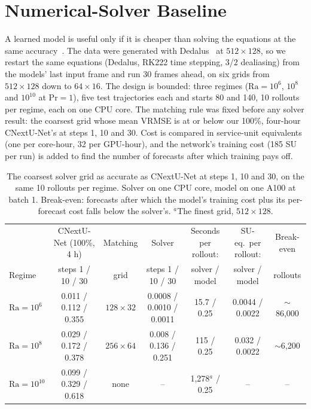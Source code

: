 \documentclass[11pt]{article}
\begin{document}
\section{Numerical-Solver Baseline}
\label{sec:solver}

A learned model is useful only if it is cheaper than solving the equations at the same accuracy~\cite{mcgreivy2024weak}.
The data were generated with Dedalus~\cite{burns2020dedalus} at $512\times128$, so we restart the same equations
(Dedalus, RK222 time stepping, 3/2 dealiasing) from the models' last input frame and run 30 frames ahead, on six
grids from $512\times128$ down to $64\times16$. The design is bounded: three regimes ($\mathrm{Ra}=10^6$, $10^8$ and
$10^{10}$ at $\mathrm{Pr}=1$), five test trajectories each and starts 80 and 140, 10 rollouts per regime, each on one
CPU core. The matching rule was fixed before any solver result: the coarsest grid whose mean VRMSE is at or below our
100\%, four-hour CNextU-Net's at steps 1, 10 and 30. Cost is compared in service-unit equivalents (one per core-hour,
32 per GPU-hour), and the network's training cost (185 SU per run) is added to find the number of forecasts after
which training pays off.

\begin{table}[tp]
\centering\scriptsize
\setlength{\tabcolsep}{3.5pt}
\begin{tabular}{@{}lcccccc@{}}
\toprule
& CNextU-Net (100\%, 4 h) & Matching & Solver & Seconds per rollout: & SU-eq.\ per rollout: & Break-even \\
Regime & steps 1 / 10 / 30 & grid & steps 1 / 10 / 30 & solver / model & solver / model & rollouts \\
\midrule
$\mathrm{Ra}=10^6$ & 0.011 / 0.112 / 0.355 & $128\times32$ & 0.0008 / 0.0010 / 0.0011 & 15.7 / 0.25 & 0.0044 / 0.0022 & $\sim$86,000 \\
$\mathrm{Ra}=10^8$ & 0.029 / 0.172 / 0.378 & $256\times64$ & 0.008 / 0.136 / 0.251 & 115 / 0.25 & 0.032 / 0.0022 & $\sim$6,200 \\
$\mathrm{Ra}=10^{10}$ & 0.099 / 0.329 / 0.618 & none & -- & 1,278$^{a}$ / 0.25 & -- & -- \\
\bottomrule
\end{tabular}
\caption{The coarsest solver grid as accurate as CNextU-Net at steps 1, 10 and 30, on the same 10 rollouts per
regime. Solver on one CPU core, model on one A100 at batch 1. Break-even: forecasts after which the model's training
cost plus its per-forecast cost falls below the solver's. $^{a}$The finest grid, $512\times128$.}
\label{tab:solver}
\end{table}
\end{document}

